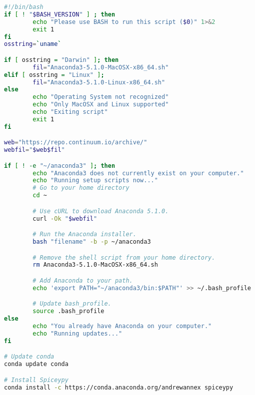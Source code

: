 \documentclass[crop=false,class=book]{standalone}
\begin{document}
\begin{lstlisting}[language=bash,frame=single,caption=rssconfig.sh shell script]
#!/bin/bash
if [ ! "$BASH_VERSION" ] ; then
        echo "Please use BASH to run this script ($0)" 1>&2
        exit 1
fi
osstring=`uname`

if [ osstring = "Darwin" ]; then
        fil="Anaconda3-5.1.0-MacOSX-x86_64.sh"
elif [ osstring = "Linux" ];
        fil="Anaconda3-5.1.0-Linux-x86_64.sh"
else
        echo "Operating System not recognized"
        echo "Only MacOSX and Linux supported"
        echo "Exiting script"
        exit 1
fi

web="https://repo.continuum.io/archive/"
webfil="$web$fil"

if [ ! -e "~/anaconda3" ]; then
        echo "Anaconda3 does not currently exist on your computer."
        echo "Running setup scripts now..."
        # Go to your home directory
        cd ~

        # Use cURL to download Anaconda 5.1.0.
        curl -Ok "$webfil"

        # Run the Anaconda installer.
        bash "filename" -b -p ~/anaconda3

        # Remove the shell script from your home directory.
        rm Anaconda3-5.1.0-MacOSX-x86_64.sh

        # Add Anaconda to your path.
        echo 'export PATH="~/anaconda3/bin:$PATH"' >> ~/.bash_profile

        # Update bash_profile.
        source .bash_profile
else
        echo "You already have Anaconda on your computer."
        echo "Running updates..."
fi

# Update conda
conda update conda

# Install Spiceypy
conda install -c https://conda.anaconda.org/andrewannex spiceypy
\end{lstlisting}
\end{document}
